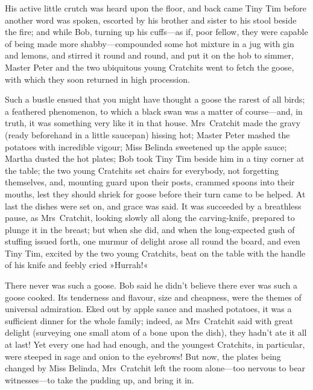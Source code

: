 His active little crutch was heard upon the floor, and back came Tiny Tim before another word was spoken, escorted by his brother and sister to his stool beside the fire; and while Bob, turning up his cuffs---as if, poor fellow, they were capable of being made more shabby---compounded some hot mixture in a jug with gin and lemons, and stirred it round and round, and put it on the hob to simmer, Master Peter and the two ubiquitous young Cratchits went to fetch the goose, with which they soon returned in high procession.



Such a bustle ensued that you might have thought a goose the rarest of all birds; a feathered phenomenon, to which a black swan was a matter of course---and, in truth, it was something very like it in that house. Mrs~Cratchit made the gravy (ready beforehand in a little saucepan) hissing hot; Master Peter mashed the potatoes with incredible vigour; Miss Belinda sweetened up the apple sauce; Martha dusted the hot plates; Bob took Tiny Tim beside him in a tiny corner at the table; the two young Cratchits set chairs for everybody, not forgetting themselves, and, mounting guard upon their posts, crammed spoons into their mouths, lest they should shriek for goose before their turn came to be helped. At last the dishes were set on, and grace was said. It was succeeded by a breathless pause, as Mrs~Cratchit, looking slowly all along the carving-knife, prepared to plunge it in the breast; but when she did, and when the long-expected gush of stuffing issued forth, one murmur of delight arose all round the board, and even Tiny Tim, excited by the two young Cratchits, beat on the table with the handle of his knife and feebly cried »Hurrah!«



There never was such a goose. Bob said he didn't believe there ever was such a goose cooked. Its tenderness and flavour, size and cheapness, were the themes of universal admiration. Eked out by apple sauce and mashed potatoes, it was a sufficient dinner for the whole family; indeed, as Mrs~Cratchit said with great delight (surveying one small atom of a bone upon the dish), they hadn't ate it all at last! Yet every one had had enough, and the youngest Cratchits, in particular, were steeped in sage and onion to the eyebrows! But now, the plates being changed by Miss Belinda, Mrs~Cratchit left the room alone---too nervous to bear witnesses---to take the pudding up, and bring it in.



